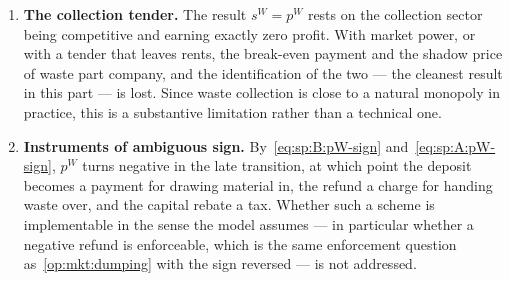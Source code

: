 \begin{enumerate}[label=\textbf{M\arabic*.},ref=M\arabic*,leftmargin=2.6em,itemsep=0.35em]
\item\label{op:mkt:tender} \textbf{The collection tender.} The result $s^W=p^W$ rests on the
collection sector being competitive and earning exactly zero profit. With market power, or with a
tender that leaves rents, the break-even payment and the shadow price of waste part company, and the
identification of the two --- the cleanest result in this part --- is lost. Since waste collection is
close to a natural monopoly in practice, this is a substantive limitation rather than a technical one.

\item\label{op:mkt:instrumentsign} \textbf{Instruments of ambiguous sign.} By~\eqref{eq:sp:B:pW-sign}
and~\eqref{eq:sp:A:pW-sign}, $p^W$ turns negative in the late transition, at which point the deposit
becomes a payment for drawing material in, the refund a charge for handing waste over, and the capital
rebate a tax. Whether such a scheme is implementable in the sense the model assumes --- in particular
whether a negative refund is enforceable, which is the same enforcement question as~\ref{op:mkt:dumping}
with the sign reversed --- is not addressed.

\end{enumerate}
